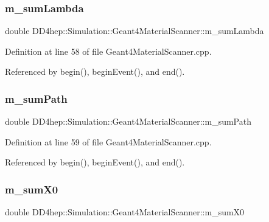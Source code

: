 \subsubsection{\texorpdfstring{m\+\_\+sum\+Lambda}{m\_sumLambda}}
{\footnotesize\ttfamily double D\+D4hep\+::\+Simulation\+::\+Geant4\+Material\+Scanner\+::m\+\_\+sum\+Lambda\hspace{0.3cm}{\ttfamily [protected]}}



Definition at line 58 of file Geant4\+Material\+Scanner.\+cpp.



Referenced by begin(), begin\+Event(), and end().

\hypertarget{class_d_d4hep_1_1_simulation_1_1_geant4_material_scanner_a2e04ec21c3f2d1800037e2dd427c8dc7}{}\label{class_d_d4hep_1_1_simulation_1_1_geant4_material_scanner_a2e04ec21c3f2d1800037e2dd427c8dc7} 
\subsubsection{\texorpdfstring{m\+\_\+sum\+Path}{m\_sumPath}}
{\footnotesize\ttfamily double D\+D4hep\+::\+Simulation\+::\+Geant4\+Material\+Scanner\+::m\+\_\+sum\+Path\hspace{0.3cm}{\ttfamily [protected]}}



Definition at line 59 of file Geant4\+Material\+Scanner.\+cpp.



Referenced by begin(), begin\+Event(), and end().

\hypertarget{class_d_d4hep_1_1_simulation_1_1_geant4_material_scanner_aa34c1dce75b345ef9586ad6f0cc24382}{}\label{class_d_d4hep_1_1_simulation_1_1_geant4_material_scanner_aa34c1dce75b345ef9586ad6f0cc24382} 
\subsubsection{\texorpdfstring{m\+\_\+sum\+X0}{m\_sumX0}}
{\footnotesize\ttfamily double D\+D4hep\+::\+Simulation\+::\+Geant4\+Material\+Scanner\+::m\+\_\+sum\+X0\hspace{0.3cm}{\ttfamily [protected]}}




